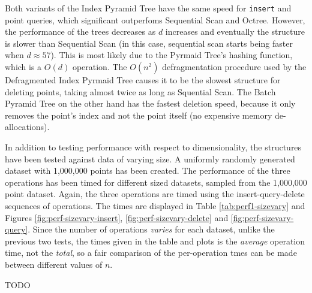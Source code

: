 Both variants of the Index Pyramid Tree have the same speed for \texttt{insert} and point queries, which significant outperfoms Sequential Scan and Octree. However, the performance of the trees decreases as $d$ increases and eventually the structure is slower than Sequential Scan (in this case, sequential scan starts being faster when $d \approx 57$). This is most likely due to the Pyrmaid Tree's hashing function, which is a $O(d)$ operation. The $O(n^2)$ defragmentation procedure used by the Defragmented Index Pyrmaid Tree causes it to be the slowest structure for deleting points, taking almost twice as long as Squential Scan. The Batch Pyramid Tree on the other hand has the fastest deletion speed, because it only removes the point's index and not the point itself (no expensive memory de-allocations).

In addition to testing performance with respect to dimensionality, the structures have been tested against data of varying size. A uniformly randomly generated dataset with 1,000,000 points has been created. The performance of the three operations has been timed for different sized datasets, sampled from the 1,000,000 point dataset. Again, the three operations are timed using the insert-query-delete sequences of operations. The times are displayed in Table \ref{tab:perf1-sizevary} and Figures \ref{fig:perf-sizevary-insert}, \ref{fig:perf-sizevary-delete} and \ref{fig:perf-sizevary-query}. Since the number of operations \textit{varies} for each dataset, unlike the previous two tests, the times given in the table and plots is the \textit{average} operation time, not the \textit{total}, so a fair comparison of the per-operation tmes can be made between different values of $n$.

TODO

